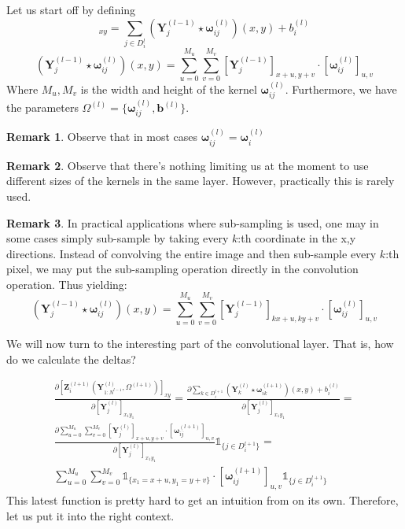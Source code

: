 \documentclass[a4paper,10pt]{article}
\theoremstyle{definition}
\newtheorem{remark}{Remark}
\begin{document}
Let us start off by defining
\begin{equation}
[\pmb{Z}^{(l)}_{i}(\pmb{Y}^{(l-1)}_{1:N^{l-1}}, \Omega^{(l)})]_{xy} = \sum_{j \in D_i^{l}} (\pmb{Y}_j^{(l-1)} \star \pmb{\omega}_{ij}^{(l)})(x,y) + b^{(l)}_i
\end{equation}
\begin{equation}
(\pmb{Y}_j^{(l-1)} \star \pmb{\omega}_{ij}^{(l)})(x,y) = \sum_{u = 0}^{M_u} \sum_{v = 0}^{M_v} [\pmb{Y}_j^{(l-1)}]_{x + u, y + v} \cdot [\pmb{\omega}_{ij}^{(l)}]_{u,v}
\end{equation}
Where $M_u, M_v$ is the width and height of the kernel $\pmb{\omega}_{ij}^{(l)}$. Furthermore, we have the parameters $\Omega^{(l)} = \{\pmb{\omega}_{ij}^{(l)}, \pmb{b}^{(l)} \}$.
\begin{remark}
	Observe that in most cases $\pmb{\omega}_{ij}^{(l)} = \pmb{\omega}_{i}^{(l)}$
\end{remark}
\begin{remark}
	Observe that there's nothing limiting us at the moment to use different sizes of the kernels in the same layer. However, practically this is rarely used.
\end{remark}
\begin{remark}
	In practical applications where sub-sampling is used, one may in some cases simply sub-sample by taking every $k$:th coordinate in the x,y directions. Instead of convolving the entire image and then sub-sample every $k$:th pixel, we may put the sub-sampling operation directly in the convolution operation. Thus yielding:
	\begin{equation}
	(\pmb{Y}_j^{(l-1)} \star \pmb{\omega}_{ij}^{(l)})(x,y) = \sum_{u = 0}^{M_u} \sum_{v = 0}^{M_v} [\pmb{Y}_j^{(l-1)}]_{kx + u, ky + v} \cdot [\pmb{\omega}_{ij}^{(l)}]_{u,v}
	\end{equation}
	\label{remark:convolutionSubSamping}
\end{remark}

We will now turn to the interesting part of the convolutional layer. That is, how do we calculate the deltas? 

\begin{gather}
\frac{\partial [\pmb{Z}^{(l + 1)}_{i}(\pmb{Y}^{(l)}_{1:N^{l-1}}, \Omega^{(l + 1)})]_{xy}}{\partial [\pmb{Y}^{(l)}_j]_{x_1y_1}} = \frac{\partial \sum_{k \in D_i^{l+1}} (\pmb{Y}_k^{(l)} \star \pmb{\omega}_{ik}^{(l + 1)})(x,y) + b^{(l)}_i}{\partial [\pmb{Y}^{(l)}_j]_{x_1y_1}} =\\
\frac{\partial \sum_{u = 0}^{M_u} \sum_{v = 0}^{M_v} [\pmb{Y}_j^{(l)}]_{x + u, y + v} \cdot [\pmb{\omega}_{ij}^{(l + 1)}]_{u,v}}{\partial [\pmb{Y}^{(l)}_j]_{x_1y_1}} \mathds{1}_{\{j \in D^{l+1}_i\}} = \\
\sum_{u = 0}^{M_u} \sum_{v = 0}^{M_v} \mathds{1}_{\{x_1 = x + u, y_1 = y + v\}} \cdot [\pmb{\omega}_{ij}^{(l+1)}]_{u,v}\mathds{1}_{\{j \in D^{l+1}_i\}}
\end{gather}
This latest function is pretty hard to get an intuition from on its own. Therefore, let us put it into the right context.
\end{document}
